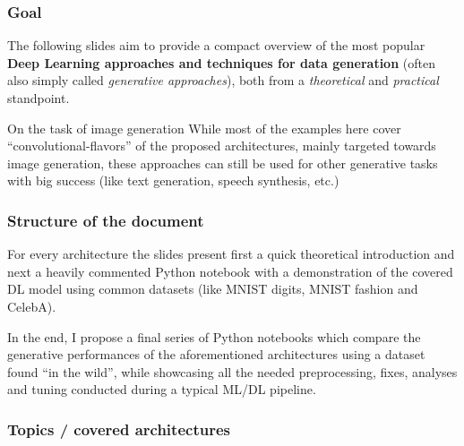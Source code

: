 \begin{frame}
    \frametitle{Goal}
    The following slides aim to provide a compact overview of the most popular \textbf{Deep Learning approaches and techniques for data generation} (often also simply called \emph{generative approaches}), both from a \emph{theoretical} and \emph{practical} standpoint.

    \begin{block}{On the task of image generation}
        While most of the examples here cover ``convolutional-flavors'' of the proposed architectures, mainly targeted towards image generation, these approaches can still be used for other generative tasks with big success (like text generation, speech synthesis, etc.)
    \end{block}

\end{frame}

\begin{frame}
    \frametitle{Structure of the document}
    For every architecture the slides present first a quick theoretical introduction and next a heavily commented Python notebook with a demonstration of the covered DL model using common datasets (like MNIST digits, MNIST fashion and CelebA).

    In the end, I propose a final series of Python notebooks which compare the generative performances of the aforementioned architectures using a dataset found ``in the wild'', while showcasing all the needed preprocessing, fixes, analyses and tuning conducted during a typical ML/DL pipeline.
\end{frame}

\begin{frame}
    \frametitle{Topics / covered architectures}
    \tableofcontents
\end{frame}